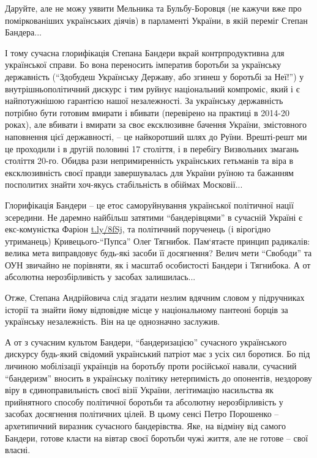 Даруйте, але не можу уявити Мельника та Бульбу-Боровця (не кажучи вже про
поміркованіших українських діячів) в парламенті України, в якій переміг Степан
Бандера... 

І тому сучасна глорифікація Степана Бандери вкрай контрпродуктивна для
української справи. Бо вона переносить імператив боротьби за українську
державність (\enquote{Здобудеш Українську Державу, або згинеш у боротьбі за Неї!}) у
внутрішньополітичний дискурс і тим руйнує національний компроміс, який і є
найпотужнішою гарантією нашої незалежності. За українську державність потрібно
бути готовим вмирати і вбивати (перевірено на практиці в 2014-20 роках), але
вбивати і вмирати за своє ексклюзивне бачення України, змістовного наповнення
цієї державності, – це найкоротший шлях до Руїни. Врешті-решт ми це проходили і
в другій половині 17 століття, і в перебігу Визвольних змагань століття 20-го.
Обидва рази непримиренність українських гетьманів та віра в ексклюзивність
своєї правди завершувалась для України руїною та бажанням посполитих знайти
хоч-якусь стабільність в обіймах Московії...

Глорифікація Бандери – це етос саморуйнування української політичної нації
зсередини. Не даремно найбільш затятими \enquote{бандерівцями} в сучасній Україні є
екс-комуністка Фаріон \url{t.ly/8fSj}, та політичний порученець (і вірогідно
утриманець) Кривецього-\enquote{Пупса} Олег Тягнибок. Пам‘ятаєте принцип радикалів:
велика мета виправдовує будь-які засоби її досягнення? Велич мети \enquote{Свободи} та
ОУН звичайно не порівняти, як і масштаб особистості Бандери і Тягнибока. А от
абсолютна нерозбірливість у засобах залишилась...

Отже, Степана Андрійовича слід згадати незлим вдячним словом у підручниках
історії та знайти йому відповідне місце у національному пантеоні борців за
українську незалежність. Він на це однозначно заслужив. 

А от з сучасним культом Бандери, \enquote{бандеризацією} сучасного українського
дискурсу будь-який свідомий український патріот має з усіх сил боротися. Бо під
личиною мобілізації українців на боротьбу проти російської навали, сучасний
\enquote{бандеризм} вносить в українську політику нетерпимість до опонентів, нездорову
віру в єдиноправильність своєї візії України, легітимацію насильства як
прийнятного способу політичної боротьби та абсолютну нерозбірливість у засобах
досягнення політичних цілей. В цьому сенсі Петро Порошенко – архетипичний
виразник сучасного бандерівства. Яке, на відміну від самого Бандери, готове
класти на вівтар своєї боротьби чужі життя, але не готове – свої власні.

